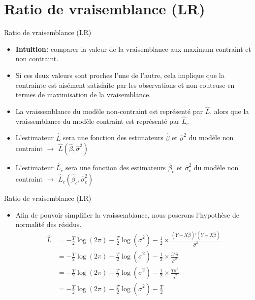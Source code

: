 \documentclass{beamer}
\begin{document}
\section{Ratio de vraisemblance (LR)}

\frame{\tableofcontents[current]}

\begin{frame}{Ratio de vraisemblance (LR)}
\begin{itemize}
\item \textbf{Intuition:} comparer la valeur de la vraisemblance aux maximum contraint et non contraint.
\item Si ces deux valeurs sont proches l’une de l’autre, cela implique que la contrainte est aisément satisfaite par les observations et non couteuse en termes de maximisation de la vraisemblance.
\item La vraissemblance du modèle non-contraint est représenté par $\hat{L}$, alors que la vraissemblance du modèle contraint est représenté par $\hat{L}_c$
\item L'estimateur $\hat{L}$ sera une fonction des estimateurs $\hat{\beta}$ et $\hat{\sigma}^2$ du modèle non contraint $\rightarrow$ $\hat{L}(\hat{\beta},\hat{\sigma}^2)$
\item L'estimateur $\hat{L}_c$ sera une fonction des estimateurs $\hat{\beta}_c$ et $\hat{\sigma}_c^2$ du modèle non contraint $\rightarrow$ $\hat{L}_c(\hat{\beta}_c,\hat{\sigma}_c^2)$
\end{itemize}
\end{frame}

\begin{frame}{Ratio de vraisemblance (LR)}
\begin{itemize}
\item Afin de pouvoir simplifier la vraissemblance, nous poserons l'hypothèse de normalité des résidus.
\begin{align*}
\hat{L} & =-\frac{T}{2} \log (2 \pi) -\frac{T}{2} \log (\hat{\sigma}^2)-\frac{1}{2} \times \frac{(Y-X \hat{\beta})'(Y-X \hat{\beta})}{\hat{\sigma}^2} \\ & =-\frac{T}{2} \log (2 \pi) -\frac{T}{2} \log (\hat{\sigma}^2)-\frac{1}{2} \times \frac{\hat{u}'\hat{u}}{\hat{\sigma}^2} \\ & = -\frac{T}{2} \log (2 \pi) -\frac{T}{2} \log (\hat{\sigma}^2)-\frac{1}{2} \times \frac{T \hat{\sigma}^2}{\hat{\sigma}^2} \\ & = -\frac{T}{2} \log (2 \pi) -\frac{T}{2} \log (\hat{\sigma}^2)-\frac{T}{2} 
\end{align*}
\end{itemize}
\end{frame}
\end{document}
